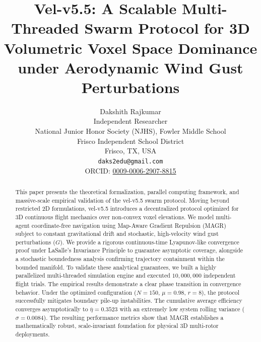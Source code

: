 \documentclass[letterpaper, 10pt, conference]{IEEEtran}
\begin{document}
\title{\LARGE \bf Vel-v5.5: A Scalable Multi-Threaded Swarm Protocol for 3D Volumetric Voxel Space Dominance under Aerodynamic Wind Gust Perturbations}

\author{
    Dakshith Rajkumar \\
    Independent Researcher \\
    National Junior Honor Society (NJHS), Fowler Middle School \\
    Frisco Independent School District \\
    Frisco, TX, USA \\
    \texttt{daks2edu@gmail.com} \\
    ORCID: \href{https://orcid.
org/0009-0006-2907-8815}{0009-0006-2907-8815}
}



\maketitle
\thispagestyle{empty}
\pagestyle{empty}

\begin{abstract}
This paper presents the theoretical formalization, parallel computing framework, and massive-scale empirical validation of the vel-v5.5 swarm protocol. Moving beyond restricted 2D formulations, vel-v5.5 introduces a decentralized protocol optimized for 3D continuous flight mechanics over non-convex voxel elevations. We model multi-agent coordinate-free navigation using Map-Aware Gradient Repulsion (MAGR) subject to constant gravitational drift and stochastic, high-velocity wind gust perturbations ($G$). We provide a rigorous continuous-time Lyapunov-like convergence proof under LaSalle's Invariance Principle to guarantee asymptotic coverage, alongside a stochastic boundedness analysis confirming trajectory containment within the bounded manifold. To validate these analytical guarantees, we built a highly parallelized multi-threaded simulation engine and executed $10{,}000{,}000$ independent flight trials. The empirical results demonstrate a clear phase transition in convergence behavior. Under the optimized configuration ($N=150$, $\mu=0.98$, $r=8$), the protocol successfully mitigates boundary pile-up instabilities. The cumulative average efficiency converges asymptotically to $\overline{\eta} = 0.3523$ with an extremely low system rolling variance ($\sigma = 0.0084$). The resulting performance metrics show that MAGR establishes a mathematically robust, scale-invariant foundation for physical 3D multi-rotor deployments.
\end{abstract}
\end{document}
